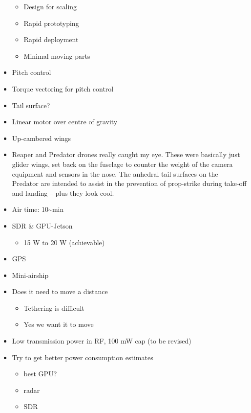\documentclass[11pt]{article}
\providecommand{\tightlist}{%
      \setlength{\itemsep}{0pt}\setlength{\parskip}{0pt}}
\begin{document}
\begin{itemize}
  \begin{itemize}
  \tightlist
  \item
    Design for scaling
  \item
    Rapid prototyping
  \item
    Rapid deployment
  \item
    Minimal moving parts
  \end{itemize}
\item
  Pitch control
\item
  Torque vectoring for pitch control
\item
  Tail surface?
\item
  Linear motor over centre of gravity
\item
  Up-cambered wings
\item
  Reaper and Predator drones really caught my eye. These were basically
  just glider wings, set back on the fuselage to counter the weight of
  the camera equipment and sensors in the nose. The anhedral tail
  surfaces on the Predator are intended to assist in the prevention of
  prop-strike during take-off and landing -- plus they look cool.
\end{itemize}

    \begin{itemize}
\tightlist
\item
  Air time: 10\textasciitilde{}min
\item
  SDR \& GPU-Jetson

  \begin{itemize}
  \tightlist
  \item
    15 W to 20 W (achievable)
  \end{itemize}
\item
  GPS
\item
  Mini-airship
\item
  Does it need to move a distance

  \begin{itemize}
  \tightlist
  \item
    Tethering is difficult
  \item
    Yes we want it to move
  \end{itemize}
\item
  Low transmission power in RF, 100 mW cap (to be revised)
\item
  Try to get better power consumption estimates

  \begin{itemize}
  \tightlist
  \item
    best GPU?
  \item
    radar
  \item
    SDR
  \end{itemize}
\end{itemize}
\end{document}
